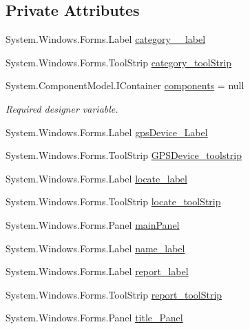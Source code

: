 \subsection*{Private Attributes}
\begin{DoxyCompactItemize}
\item 
System.\+Windows.\+Forms.\+Label \hyperlink{classWildlifeTrackingApp_1_1MainPage_ab62919eb07aea9df0b876b7bdf801745}{category\+\_\+\+\_\+label}
\item 
System.\+Windows.\+Forms.\+Tool\+Strip \hyperlink{classWildlifeTrackingApp_1_1MainPage_abf545879da1afeb721121957c32b7ae1}{category\+\_\+tool\+Strip}
\item 
System.\+Component\+Model.\+I\+Container \hyperlink{classWildlifeTrackingApp_1_1MainPage_a02595f1c09713bb71dcb2fbbfc7ffa4b}{components} = null
\begin{DoxyCompactList}\small\item\em Required designer variable. \end{DoxyCompactList}\item 
System.\+Windows.\+Forms.\+Label \hyperlink{classWildlifeTrackingApp_1_1MainPage_ab88680d024b50e48fcf07ba1c7fd1ade}{gps\+Device\+\_\+\+Label}
\item 
System.\+Windows.\+Forms.\+Tool\+Strip \hyperlink{classWildlifeTrackingApp_1_1MainPage_a20432d42ae05e87e11466d593461de02}{G\+P\+S\+Device\+\_\+toolstrip}
\item 
System.\+Windows.\+Forms.\+Label \hyperlink{classWildlifeTrackingApp_1_1MainPage_af84eec8207ceaa0e14076b855415dcea}{locate\+\_\+label}
\item 
System.\+Windows.\+Forms.\+Tool\+Strip \hyperlink{classWildlifeTrackingApp_1_1MainPage_aef30fcc86c717364f65f5a49927f1227}{locate\+\_\+tool\+Strip}
\item 
System.\+Windows.\+Forms.\+Panel \hyperlink{classWildlifeTrackingApp_1_1MainPage_a094665b3f6c785c28d99b6261dc95eb0}{main\+Panel}
\item 
System.\+Windows.\+Forms.\+Label \hyperlink{classWildlifeTrackingApp_1_1MainPage_af6ba70393d92ce2a983bf47ab956b019}{name\+\_\+label}
\item 
System.\+Windows.\+Forms.\+Label \hyperlink{classWildlifeTrackingApp_1_1MainPage_a6c60ee802abc7c2be3dda738a63abc86}{report\+\_\+label}
\item 
System.\+Windows.\+Forms.\+Tool\+Strip \hyperlink{classWildlifeTrackingApp_1_1MainPage_a910f81e378fc8c66e03a986cfa7c5b4d}{report\+\_\+tool\+Strip}
\item 
System.\+Windows.\+Forms.\+Panel \hyperlink{classWildlifeTrackingApp_1_1MainPage_ad9987c4b3ca7748f440a16a357ce86e5}{title\+\_\+\+Panel}
\end{DoxyCompactItemize}
